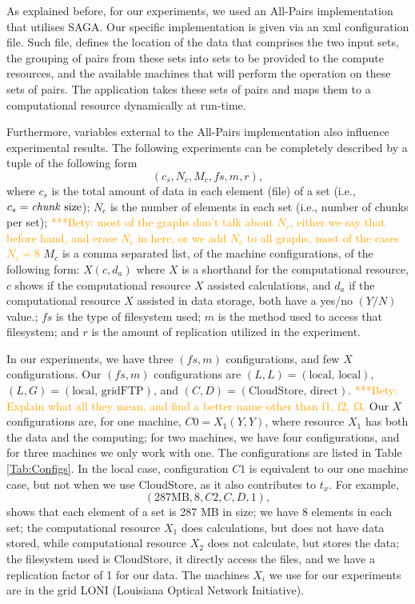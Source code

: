 \documentclass{rspublic}
\newcommand{\betynote}[1]{ {\textcolor{orange} { ***Bety: #1 }}}
\begin{document}
As explained before, for our experiments, we used an All-Pairs implementation
that utilises SAGA. Our specific implementation is given via an xml
configuration file. Such file, defines the location of the data that comprises
the two input sets, the grouping of pairs from these sets into sets to be
provided to the compute resources, and the available machines that will perform
the operation on these sets of pairs. The application takes these sets of pairs
and maps them to a computational resource dynamically at run-time.

Furthermore, variables external to the All-Pairs implementation also
influence experimental results. The following experiments can be
completely described by a tuple of the following form
 \begin{equation}
(c_s, N_c, M_c, fs, m,r),
\label{Eq:tuple}
\end{equation}
where $c_s$ is the total amount of data in each element (file) of a set (i.e., $c_s=\mbox{\textit{chunk} size}$); 
$N_c$ is the number of elements in each set (i.e., number of chunks per set); \betynote{most of the graphs don't talk about $N_c$, either we say that before hand, and erase $N_c$ in here, or we add $N_c$ to all graphs, most of the cases  $N_c= 8$}
$M_c$ is a comma separated list, of the machine configurations, of the following
form: $X(c, d_a)$ where $X$ is a shorthand for the computational resource,  $c$ shows if the computational resource $X$ assisted calculations, and $d_a$ if
the computational resource $X$ assisted in data storage, both have a yes/no $(Y/N)$ value.; 
$fs$ is the type of filesystem used;
$m$ is the method used to access that filesystem; and
$r$ is the amount of replication utilized in the experiment. 

In our experiments, we have three $(fs, m)$ configurations, and few $X$ configurations. Our $(fs, m)$ configurations are $(L,L)=(\mbox{local, local})$, $(L,G)=(\mbox{local, gridFTP})$, and $(C,D)=(\mbox{CloudStore, direct})$.\betynote{Explain what all they mean, and find a better name other than f1, f2, f3.} Our $X$ configurations are, for one machine, $C0=X_1(Y,Y)$, where resource $X_1$ has both the data and the computing; for two machines, we have four configurations, and for three machines we only work with one. The configurations are listed in Table \ref{Tab:Configs}. In the local case, configuration $C1$ is equivalent to our one machine case, but not when we use CloudStore, as it also contributes to $t_x$. For example, 
 \begin{equation}
(287 \mbox{MB}, 8, C2, C, D, 1),
\end{equation}
shows that each element of a set is 287 MB in size; we have 8 elements
in each set; the computational resource $X_1$ does calculations, but does
not have data stored, while computational resource $X_2$ does not
calculate, but stores the data; the filesystem used is CloudStore, it
directly access the files, and we have a replication factor of 1 for our
data. The machines $X_i$ we use for our experiments are in the grid LONI (Louisiana Optical Network Initiative).
\end{document}
